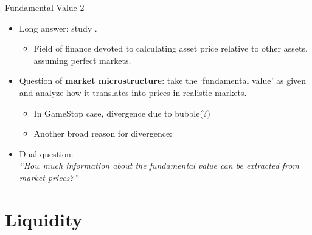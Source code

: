 \documentclass[english,10pt
,aspectratio=169
]{beamer}
\begin{document}
\begin{frame}{Fundamental Value 2}
	\begin{itemize}
		\item Long answer: study .
		\begin{itemize}
			\item Field of finance devoted to calculating asset price relative to other assets, assuming perfect markets.
		\end{itemize}
		
		\bigskip
		\pause
		
		\item Question of \textbf{market microstructure}: take the `\alert{fundamental value}' as given and analyze how it \alert{translates into prices} in realistic markets.
		\pause
		\begin{itemize}
			\item In GameStop case, divergence due to bubble(?)
			\item Another broad reason for divergence: 
		\end{itemize}
		
		\pause[2]
		\item Dual question:  \\
		\emph{``How much information about the fundamental value can be extracted from market prices?''}
	\end{itemize}
\end{frame}



\section{Liquidity}
\end{document}
